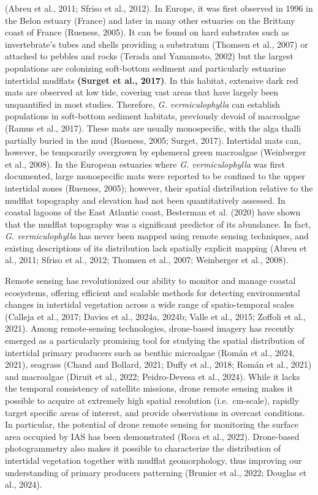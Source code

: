 \documentclass[
  letterpaper,
  DIV=11,
  numbers=noendperiod]{scrartcl}
\begin{document}
(Abreu et al., 2011; Sfriso et al., 2012). In Europe, it was first
observed in 1996 in the Belon estuary (France) and later in many other
estuaries on the Brittany coast of France (Rueness, 2005). It can be
found on hard substrates such as invertebrate's tubes and shells
providing a substratum (Thomsen et al., 2007) or attached to pebbles and
rocks (Terada and Yamamoto, 2002) but the largest populations are
colonizing soft-bottom sediment and particularly estuarine intertidal
mudflats \textbf{(Surget et al., 2017)}. In this habitat, extensive dark
red mats are observed at low tide, covering vast areas that have largely
been unquantified in most studies. Therefore, \emph{G. vermiculophylla}
can establish populations in soft-bottom sediment habitats, previously
devoid of macroalgae (Ramus et al., 2017). These mats are usually
monospecific, with the alga thalli partially buried in the mud (Rueness,
2005; Surget, 2017). Intertidal mats can, however, be temporarily
overgrown by ephemeral green macroalgae (Weinberger et al., 2008). In
the European estuaries where \emph{G. vermiculophylla} was first
documented, large monospecific mats were reported to be confined to the
upper intertidal zones (Rueness, 2005); however, their spatial
distribution relative to the mudflat topography and elevation had not
been quantitatively assessed. In coastal lagoons of the East Atlantic
coast, Besterman et al. (2020) have shown that the mudflat topography
was a significant predictor of its abundance. In fact, \emph{G.
vermiculophylla} has never been mapped using remote sensing techniques,
and existing descriptions of its distribution lack spatially explicit
mapping (Abreu et al., 2011; Sfriso et al., 2012; Thomsen et al., 2007;
Weinberger et al., 2008).

Remote sensing has revolutionized our ability to monitor and manage
coastal ecosystems, offering efficient and scalable methods for
detecting environmental changes in intertidal vegetation across a wide
range of spatio-temporal scales (Calleja et al., 2017; Davies et al.,
2024a, 2024b; Valle et al., 2015; Zoffoli et al., 2021). Among
remote-sensing technologies, drone-based imagery has recently emerged as
a particularly promising tool for studying the spatial distribution of
intertidal primary producers such as benthic microalgae (Román et al.,
2024, 2021), seagrass (Chand and Bollard, 2021; Duffy et al., 2018;
Román et al., 2021) and macroalgae (Diruit et al., 2022; Peidro-Devesa
et al., 2024). While it lacks the temporal consistency of satellite
missions, drone remote sensing makes it possible to acquire at extremely
high spatial resolution (i.e.~cm-scale), rapidly target specific areas
of interest, and provide observations in overcast conditions. In
particular, the potential of drone remote sensing for monitoring the
surface area occupied by IAS has been demonstrated (Roca et al., 2022).
Drone-based photogrammetry also makes it possible to characterize the
distribution of intertidal vegetation together with mudflat
geomorphology, thus improving our understanding of primary producers
patterning (Brunier et al., 2022; Douglas et al., 2024).
\end{document}
